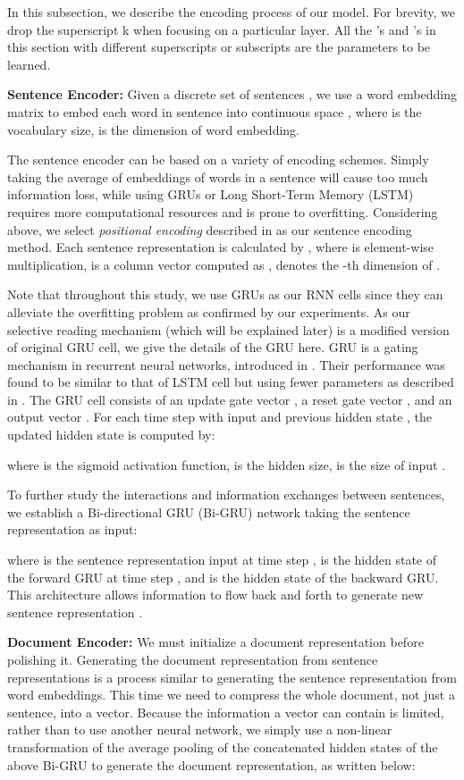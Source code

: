 \documentclass[11pt,a4paper]{article}
\begin{document}
In this subsection, we describe the encoding process of our model.
For brevity, we drop the superscript k when focusing on a particular layer.
All the 's and 's in this section  with different superscripts or subscripts are the parameters to be learned.


\textbf{Sentence Encoder: } 
Given a discrete set of sentences , we use a word embedding matrix  to embed each word  in sentence  into continuous space , where  is the vocabulary size,  is the dimension of word embedding.

The sentence encoder can be based on a variety of encoding schemes.
Simply taking the average of embeddings of words in a sentence will cause too much information loss, while using GRUs or Long Short-Term Memory (LSTM) requires more computational resources and is prone to overfitting. 
Considering above, we select \textit{positional encoding} described in \cite{sukhbaatar2015end} as our sentence encoding method.
Each sentence representation  is calculated by , where  is element-wise multiplication, 
 is a column vector computed as ,  denotes the -th dimension of . 

Note that throughout this study, we use GRUs as our RNN cells since they can alleviate the overfitting problem as confirmed by our experiments.
As our selective reading mechanism (which will be explained later) is a modified version of original GRU cell, we give the details of the GRU here.
GRU is a gating mechanism in recurrent neural networks, introduced in \cite{Cho2014Learning}. Their performance was found to be similar to that of LSTM cell but using fewer parameters as described in \cite{hochreiter1997long}.
The GRU cell consists of an update gate vector , a reset gate vector , and an output vector .
For each time step  with input  and previous hidden state , the updated hidden state  is computed by:

where  is the sigmoid activation function,  is the hidden size,  is the size of input .

To further study the interactions and information exchanges between sentences, we establish a Bi-directional GRU (Bi-GRU) network taking the sentence representation as input:

where  is the sentence representation input at time step ,  is the hidden state of the forward GRU at time step , and  is the hidden state of the backward GRU.
This architecture allows information to flow back and forth to generate new sentence representation .

\textbf{Document Encoder: } 
We must initialize a document representation before polishing it.
Generating the document representation from sentence representations is a process similar to generating the sentence representation from word embeddings. This time we need to compress the whole document, not just a sentence, into a vector.  
Because the information a vector can contain is limited, rather than to use another neural network, we simply use a non-linear transformation of the average pooling of the concatenated hidden states of the above Bi-GRU to generate the document representation, as written below:
\end{document}
